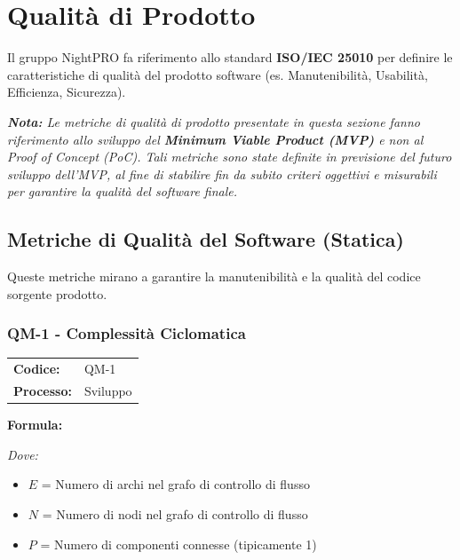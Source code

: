 \documentclass[a4paper,11pt,oneside]{scrartcl}
\begin{document}
\section{Qualità di Prodotto}

Il gruppo NightPRO fa riferimento allo standard \textbf{ISO/IEC 25010}{\scriptsize{}} per definire le caratteristiche di qualità del prodotto software (es. Manutenibilità, Usabilità, Efficienza, Sicurezza).

\vspace{0.3cm}
\noindent\textit{\textbf{Nota:} Le metriche di qualità di prodotto presentate in questa sezione fanno riferimento allo sviluppo del \textbf{Minimum Viable Product (MVP)}{\scriptsize{}} e non al Proof of Concept (PoC){\scriptsize{}}. Tali metriche sono state definite in previsione del futuro sviluppo dell'MVP, al fine di stabilire fin da subito criteri oggettivi e misurabili per garantire la qualità del software finale.}
\vspace{0.3cm}

\subsection{Metriche di Qualità del Software (Statica)}
Queste metriche mirano a garantire la manutenibilità e la qualità del codice sorgente prodotto.

\subsubsection{QM-1 - Complessità Ciclomatica}

\noindent
\begin{tabular}{@{}p{}p{}@{}}
\textbf{Codice:} & QM-1 \\
\textbf{Processo:} & Sviluppo \\
\end{tabular}

\vspace{0.3cm}
\noindent\textbf{Formula:}

\noindent\textit{Dove:}
\begin{itemize}[leftmargin=1.5cm, topsep=0pt, itemsep=0pt]
    \item $E$ = Numero di archi nel grafo di controllo di flusso
    \item $N$ = Numero di nodi nel grafo di controllo di flusso
    \item $P$ = Numero di componenti connesse (tipicamente 1)
\end{itemize}
\end{document}
